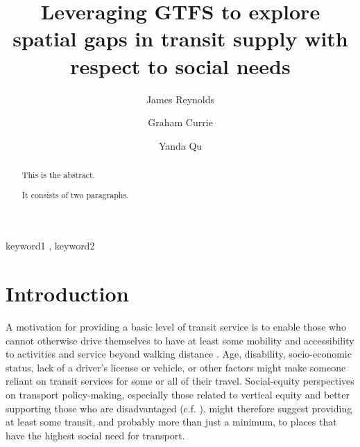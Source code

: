 \documentclass[preprint, 3p,
authoryear]{elsarticle} %
\begin{document}
\begin{frontmatter}

  \title{Leveraging GTFS to explore spatial gaps in transit supply with
respect to social needs}
    \author[Public Transport Research Group (PTRG)]{James Reynolds%
  }
    \author[Public Transport Research Group (PTRG)]{Graham Currie%
  }
    \author[Public Transport Research Group (PTRG)]{Yanda Qu%
  }
  
  \begin{abstract}
  This is the abstract.

  It consists of two paragraphs.
  \end{abstract}
    \begin{keyword}
    keyword1 \sep 
    keyword2
  \end{keyword}
  
 \end{frontmatter}

\section{Introduction}\label{introduction}

A motivation for providing a basic level of transit service is to enable
those who cannot otherwise drive themselves to have at least some
mobility and accessibility to activities and service beyond walking
distance \citep{Currie:2016aa}. Age, disability, socio-economic status,
lack of a driver's license or vehicle, or other factors might make
someone reliant on transit services for some or all of their travel.
Social-equity perspectives on transport policy-making, especially those
related to vertical equity and better supporting those who are
disadvantaged (c.f. \citet{Litman:2016aa}), might therefore suggest
providing at least some transit, and probably more than just a minimum,
to places that have the highest social need for transport.
\end{document}
